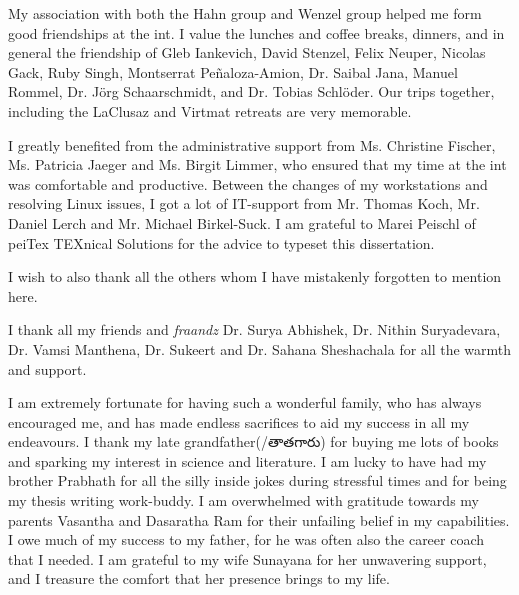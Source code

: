 My association with both the Hahn group and Wenzel group helped me form good friendships at the \gls{int}. I value the lunches and coffee breaks, dinners, and in general the friendship of Gleb Iankevich, David Stenzel, Felix Neuper, Nicolas Gack, Ruby Singh, Montserrat Pe\~naloza-Amion, Dr. Saibal Jana, Manuel Rommel, Dr. J\"org Schaarschmidt, and Dr. Tobias Schl\"oder. Our trips together, including the LaClusaz and Virtmat retreats are very memorable. \par

I greatly benefited from the administrative support from Ms. Christine Fischer, Ms. Patricia Jaeger and Ms. Birgit Limmer, who ensured that my time at the \gls{int} was comfortable and productive. Between the changes of my workstations and resolving Linux issues, I got a lot of IT-support from Mr. Thomas Koch, Mr. Daniel Lerch and Mr. Michael Birkel-Suck. I am grateful to Marei Peischl of peiTex TEXnical Solutions for the \tex  advice to typeset this dissertation. \par

I wish to also thank all the others whom I have mistakenly forgotten to mention here. \par

I thank all my friends and \textit{fraandz} Dr. Surya Abhishek, Dr. Nithin Suryadevara, Dr. Vamsi Manthena, Dr. Sukeert and Dr. Sahana Sheshachala for all the warmth and support. \par 

I am extremely fortunate for having such a wonderful family, who has always encouraged me, and has made endless sacrifices to aid my success in all my endeavours. I thank my late grandfather(/{\tel తాతగారు}) for buying me lots of books and sparking my interest in science and literature. I am lucky to have had my brother Prabhath for all the silly inside jokes during stressful times and for being my thesis writing work-buddy. I am overwhelmed with gratitude towards my parents Vasantha and Dasaratha Ram for their unfailing belief in my capabilities. I owe much of my success to my father, for he was often also the career coach that I needed. I am grateful to my wife Sunayana for her unwavering support, and I treasure the comfort that her presence brings to my life.

\clearpage